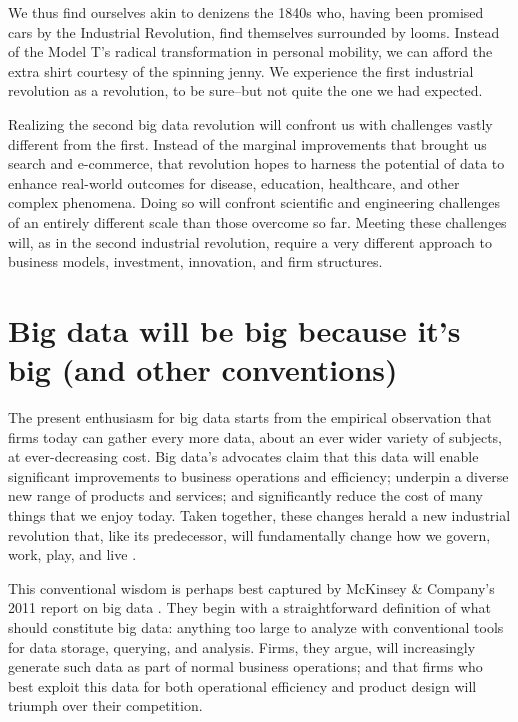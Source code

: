 \documentclass[12pt]{article}
\begin{document}
We thus find ourselves akin to denizens the 1840s who, having been
promised cars by the Industrial Revolution, find themselves surrounded
by looms. Instead of the Model T's radical transformation in personal
mobility, we can afford the extra shirt courtesy of the spinning
jenny. We experience the first industrial revolution as a revolution,
to be sure--but not quite the one we had expected. 

Realizing the second big data revolution will confront us with
challenges vastly different from the first. Instead of the marginal
improvements that brought us search and e-commerce, that revolution
hopes to harness the potential of data to enhance real-world outcomes
for disease, education, healthcare, and other complex phenomena. Doing
so will confront scientific and engineering challenges of an entirely
different scale than those overcome so far. Meeting these challenges
will, as in the second industrial revolution, require a very different
approach to business models, investment, innovation, and firm
structures. 


\section{Big data will be big because it's big (and other conventions)}
\label{sec:convention-reality}

The present enthusiasm for big data starts from the empirical
observation that firms today can gather every more data, about an ever
wider variety of subjects, at ever-decreasing cost. Big data's
advocates claim that this data will enable significant improvements to
business operations and efficiency; underpin a diverse new range of
products and services; and significantly reduce the cost of many
things that we enjoy today. Taken together, these changes herald a new
industrial revolution that, like its predecessor, will fundamentally
change how we govern, work, play, and live \citep{mayer2013big}.

This conventional wisdom is perhaps best captured by McKinsey \&
Company's 2011 report on big data \citep{mckinsey2011}. They begin
with a straightforward definition of what should constitute big data:
anything too large to analyze with conventional tools for data
storage, querying, and analysis. Firms, they argue, will increasingly
generate such data as part of normal business operations; and that
firms who best exploit this data for both operational efficiency and
product design will triumph over their competition.
\end{document}
